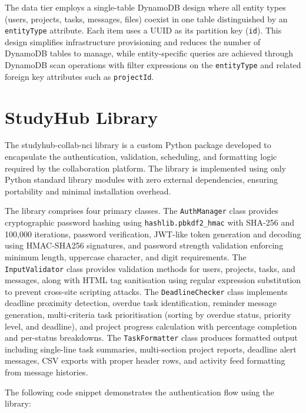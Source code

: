 \documentclass[conference]{IEEEtran}
\begin{document}
The data tier employs a single-table DynamoDB design where all entity types (users, projects, tasks, messages, files) coexist in one table distinguished by an \texttt{entityType} attribute. Each item uses a UUID as its partition key (\texttt{id}). This design simplifies infrastructure provisioning and reduces the number of DynamoDB tables to manage, while entity-specific queries are achieved through DynamoDB scan operations with filter expressions on the \texttt{entityType} and related foreign key attributes such as \texttt{projectId}.

\section{StudyHub Library}

The studyhub-collab-nci library is a custom Python package developed to encapsulate the authentication, validation, scheduling, and formatting logic required by the collaboration platform. The library is implemented using only Python standard library modules with zero external dependencies, ensuring portability and minimal installation overhead.

The library comprises four primary classes. The \texttt{AuthManager} class provides cryptographic password hashing using \texttt{hashlib.pbkdf2\_hmac} with SHA-256 and 100,000 iterations, password verification, JWT-like token generation and decoding using HMAC-SHA256 signatures, and password strength validation enforcing minimum length, uppercase character, and digit requirements. The \texttt{InputValidator} class provides validation methods for users, projects, tasks, and messages, along with HTML tag sanitisation using regular expression substitution to prevent cross-site scripting attacks. The \texttt{DeadlineChecker} class implements deadline proximity detection, overdue task identification, reminder message generation, multi-criteria task prioritisation (sorting by overdue status, priority level, and deadline), and project progress calculation with percentage completion and per-status breakdowns. The \texttt{TaskFormatter} class produces formatted output including single-line task summaries, multi-section project reports, deadline alert messages, CSV exports with proper header rows, and activity feed formatting from message histories.

The following code snippet demonstrates the authentication flow using the library:
\end{document}
